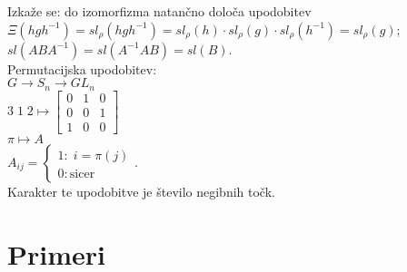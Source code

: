 \documentclass[a4paper, 12pt]{book}
\theoremstyle{definition}
\theoremstyle{remark}
\begin{document}
Izkaže se: do izomorfizma natančno določa upodobitev \\
$\Xi\left(h g h^{-1}\right) = sl_{\rho}\left(h g h^{-1}\right) = sl_{\rho}(h) \cdot sl_{\rho}(g) \cdot sl_{\rho}(h^{-1})
= sl_{\rho}(g)$; \\
$sl\left(A B A^{-1}\right) = sl\left(A^{-1} A B\right) = sl(B)$. \\
Permutacijska upodobitev: \\
$G \to S_n \to GL_n$ \\
$3 \; 1 \; 2 \mapsto
\begin{bmatrix}
  0 & 1 & 0 \\
  0 & 0 & 1 \\
  1 & 0 & 0
\end{bmatrix}$ \\
$\pi \mapsto A$ \\
$A_{ij} = \begin{cases}
  1: \; i = \pi(j) \\
  0: \text{sicer}
\end{cases}$. \\
Karakter te upodobitve je število negibnih točk.


\section{Primeri}
\end{document}
